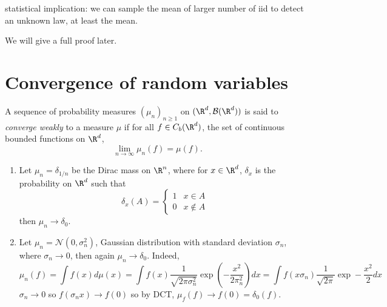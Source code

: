 \documentclass[a4paper]{article}
\begin{document}
statistical implication: we can sample the mean of larger number of iid to detect an unknown law, at least the mean.

We will give a full proof later.

\section{Convergence of random variables}

\begin{definition}
  A sequence of probability measures \((\mu_n)_{n \geq 1}\) on \((\R^d, \mathcal B(\R^d))\) is said to \emph{converge weakly} to a measure \(\mu\) if for all \(f \in C_b(\R^d)\), the set of continuous bounded functions on \(\R^d\),
  \[
    \lim_{n \to \infty} \mu_n(f) = \mu(f).
  \]
\end{definition}

\begin{eg}\leavevmode
  \begin{enumerate}
  \item Let \(\mu_n = \delta_{1/n}\) be the Dirac mass on \(\R^n\), where for \(x \in \R^d\), \(\delta_x\) is the probability on \(\R^d\) such that
    \[
      \delta_x(A) =
      \begin{cases}
        1 & x \in A \\
        0 & x \notin A
      \end{cases}
    \]
    then \(\mu_n \to \delta_0\).
  \item Let \(\mu_n = \mathcal N(0, \sigma_n^2)\), Gaussian distribution with standard deviation \(\sigma_n\), where \(\sigma_n \to 0\), then again \(\mu_n \to \delta_0\). Indeed,
    \[
      \mu_n(f)
      = \int f(x) d\mu(x)
      = \int f(x) \frac{1}{\sqrt{2\pi \sigma_n^2}} \exp (- \frac{x^2}{2\pi_n^2}) dx
      = \int f(x\sigma_n) \frac{1}{\sqrt{2\pi}} \exp - \frac{x^2}{2} dx
    \]
    \(\sigma_n \to 0\) so \(f(\sigma_n x) \to f(0)\) so by DCT, \(\mu_f(f) \to f(0) = \delta_0(f)\).
  \end{enumerate}
\end{eg}
\end{document}
